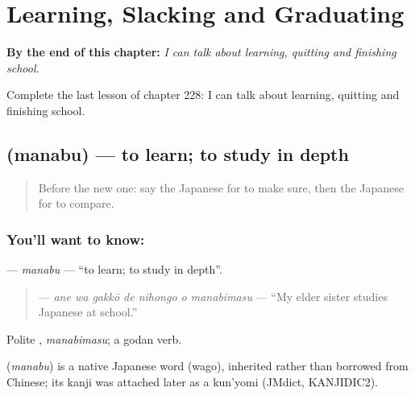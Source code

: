 
\chapter{Learning, Slacking and Graduating}
\label{ch:ja-learning-slacking-and-graduating}

\begin{chapteropening}
\textbf{By the end of this chapter:} \emph{I can talk about learning, quitting and finishing school.}

Complete the last lesson of chapter 228: I can talk about learning, quitting and finishing school.
\end{chapteropening}

\section[\texorpdfstring{\ja{まなぶ} (manabu)}{まなぶ (manabu)}]{ (manabu) — to learn; to study in depth}

\label{lesson:JA-C228-manabu}



\begin{quote}
Before the new one: say the Japanese for to make sure, then the Japanese for to compare.
\end{quote}

\subsection*{You'll want to know: }
\textbf{} — \emph{manabu} — \textquotedblleft{}to learn; to study in depth\textquotedblright{}.

\begin{quote}
\textbf{   } — \emph{ane wa gakkō de nihongo o manabimasu} — \textquotedblleft{}My elder sister studies Japanese at school.\textquotedblright{}
\end{quote}

Polite \textbf{}, \emph{manabimasu}; a godan verb.

\begin{cousinweb}
\textbf{} (\emph{manabu}) is a native Japanese word (wago), inherited rather than borrowed from Chinese; its kanji was attached later as a kun'yomi (JMdict, KANJIDIC2).
\end{cousinweb}


